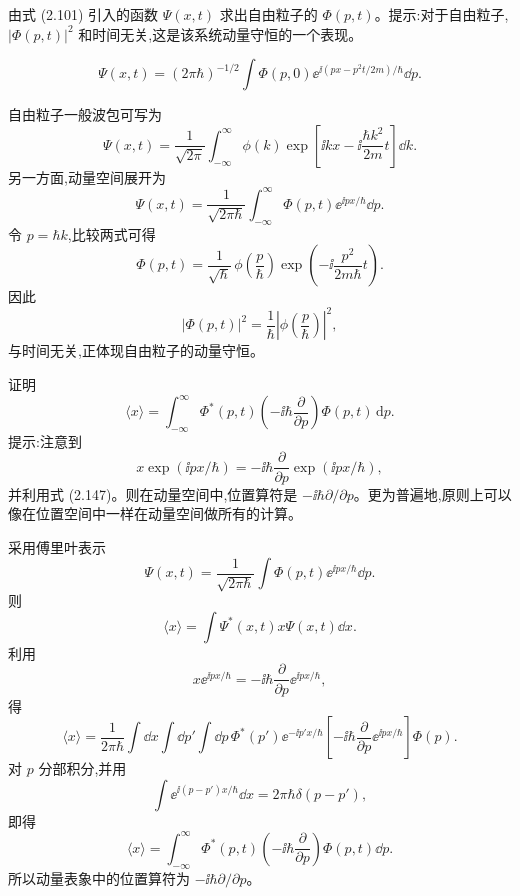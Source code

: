 \begin{question}
由式 (2.101) 引入的函数 $\Psi(x,t)$ 求出自由粒子的 $\Phi(p,t)$。提示:对于自由粒子,$|\Phi(p,t)|^2$ 和时间无关,这是该系统动量守恒的一个表现。

\par\smallskip
{}\[\Psi(x,t)=(2\pi\hbar)^{-1/2}\int \Phi(p,0)\ee^{\ii(px-p^2t/2m)/\hbar}\dd p.\]

\begin{solution}
自由粒子一般波包可写为
\[
\Psi(x,t)=\frac1{\sqrt{2\pi}}\int_{-\infty}^{\infty}
\phi(k)\exp\left[\ii kx-\ii\frac{\hbar k^2}{2m}t\right]\dd k.
\]
另一方面,动量空间展开为
\[
\Psi(x,t)=\frac1{\sqrt{2\pi\hbar}}\int_{-\infty}^{\infty}
\Phi(p,t)\ee^{\ii px/\hbar}\dd p.
\]
令 $p=\hbar k$,比较两式可得
\[
\boxed{\Phi(p,t)=\frac1{\sqrt\hbar}\,\phi\left(\frac p\hbar\right)
\exp\left(-\ii\frac{p^2}{2m\hbar}t\right).}
\]
因此
\[
|\Phi(p,t)|^2=\frac1\hbar\left|\phi\left(\frac p\hbar\right)\right|^2,
\]
与时间无关,正体现自由粒子的动量守恒。
\end{solution}
\end{question}

\begin{question}
证明
\[
\langle x\rangle=\int_{-\infty}^{\infty}\Phi^*(p,t)\left(-\ii\hbar\frac{\partial}{\partial p}\right)\Phi(p,t)\,\mathrm dp .
\tag{3.57}
\]
提示:注意到
\[
x\exp(\ii px/\hbar)=-\ii\hbar\frac{\partial}{\partial p}\exp(\ii px/\hbar),
\]
并利用式 (2.147)。则在动量空间中,位置算符是 $-\ii\hbar\partial/\partial p$。更为普遍地,原则上可以像在位置空间中一样在动量空间做所有的计算。

\par\smallskip
{}

\begin{solution}
采用傅里叶表示
\[
\Psi(x,t)=\frac1{\sqrt{2\pi\hbar}}\int \Phi(p,t)\ee^{\ii px/\hbar}\dd p.
\]
则
\[
\langle x\rangle=\int \Psi^*(x,t)x\Psi(x,t)\dd x.
\]
利用
\[
x \ee^{\ii px/\hbar}=-\ii\hbar\frac{\partial}{\partial p}\ee^{\ii px/\hbar},
\]
得
\[
\langle x\rangle
=\frac1{2\pi\hbar}\int\dd x\int\dd p'\int\dd p\,
\Phi^*(p')\ee^{-\ii p'x/\hbar}\left[-\ii\hbar\frac{\partial}{\partial p}\ee^{\ii px/\hbar}\right]\Phi(p).
\]
对 $p$ 分部积分,并用
\[
\int \ee^{\ii(p-p')x/\hbar}\dd x=2\pi\hbar\delta(p-p'),
\]
即得
\[
\boxed{\langle x\rangle=\int_{-\infty}^{\infty}\Phi^*(p,t)
\left(-\ii\hbar\frac{\partial}{\partial p}\right)\Phi(p,t)\dd p.}
\]
所以动量表象中的位置算符为 $-\ii\hbar\partial/\partial p$。
\end{solution}
\end{question}

